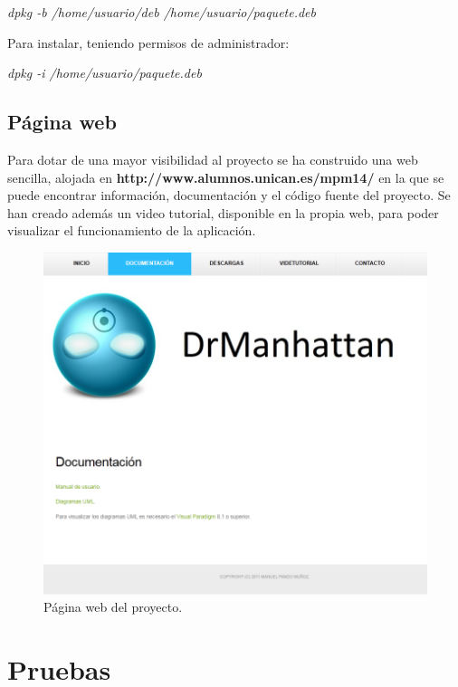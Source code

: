 \begin{center}
    \emph{dpkg -b /home/usuario/deb /home/usuario/paquete.deb}
\end{center}

Para instalar, teniendo permisos de administrador:

\begin{center}
    \emph{dpkg -i /home/usuario/paquete.deb}
\end{center}


\subsection{Página web}

Para dotar de una mayor visibilidad al proyecto se ha construido una web sencilla, alojada en {\bfseries http://www.alumnos.unican.es/mpm14/} en la que se puede encontrar información, documentación y el código fuente del proyecto. Se han creado además un video tutorial, disponible en la propia web, para poder visualizar el funcionamiento de la aplicación.

\begin{figure}
    \centering
    \includegraphics[width=.90\linewidth]{implementacion/web}
    \caption{Página web del proyecto.}
    \label{fig:implementacion:web}
\end{figure}





\section{Pruebas}
\label{sec:despliegue:pruebas}

